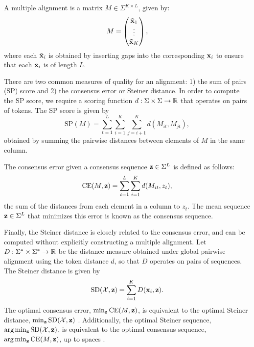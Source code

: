 \documentclass{article}
\begin{document}
A multiple alignment is a matrix $M \in \Sigma^{K \times L}$, given by:
\begin{equation}
M = \begin{pmatrix}
    \tilde{\mathbf{x}}_1 \\
    \vdots \\
    \tilde{\mathbf{x}}_K
\end{pmatrix},
\end{equation}
where each $\tilde{\mathbf{x}}_i$ is obtained by inserting gaps into the corresponding $\mathbf{x}_i$
to ensure that each $\tilde{\mathbf{x}}_i$ is of length $L$.

There are two common measures of quality for an alignment:
1) the sum of pairs (SP) score and 2) the consensus error or Steiner distance.
In order to compute the SP score, we require a scoring function $d: \Sigma\times\Sigma\to\mathbb{R}$
that operates on pairs of tokens.
The SP score is given by
\begin{equation}
\mathrm{SP}(M) = \sum_{t=1}^L \sum_{i=1}^K \sum_{j=i+1}^K d(M_{it}, M_{jt}),
\end{equation}
obtained by summing the pairwise distances between elements of $M$ in the same column.

The consensus error given a consensus sequence $\mathbf{z}\in\Sigma^L$ is defined as follows:
\begin{equation}
\mathrm{CE}(M, \mathbf{z}) = \sum_{t=1}^L \sum_{i=1}^K d(M_{it}, z_{t}),
\end{equation}
the sum of the distances from each element in a column to $z_t$.
The mean sequence $\mathbf{z}\in\Sigma^L$ that minimizes this error is known as the consensus sequence.

Finally, the Steiner distance is closely related to the consensus error,
and can be computed without explicitly constructing a multiple alignment.
Let $D: \Sigma^* \times \Sigma^* \to \mathbb{R}$
be the distance measure obtained under global pairwise alignment using the token distance $d$,
so that $D$ operates on pairs of sequences.
The Steiner distance is given by
\begin{equation}
\mathrm{SD}(\mathcal{X}, \mathbf{z}) = \sum_{i=1}^K D(\mathbf{x}_i, \mathbf{z}).
\end{equation}
The optimal consensus error, $\min_{\mathbf{z}}\mathrm{CE}(M,\mathbf{z})$,
is equivalent to the optimal Steiner distance, $\min_{\mathbf{z}}\mathrm{SD}(\mathcal{X}, \mathbf{z})$
 \citep{gusfield1997}.
Additionally, the optimal Steiner sequence, $\arg\min_{\mathbf{z}}\mathrm{SD}(\mathcal{X}, \mathbf{z})$,
is equivalent to the optimal consensus sequence, $\arg\min_{\mathbf{z}}\mathrm{CE}(M,\mathbf{z})$,
up to spaces \citep{gusfield1997}.
\end{document}
